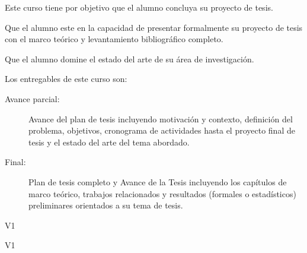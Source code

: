 \begin{syllabus}


\begin{justification}
Este curso tiene por objetivo que el alumno concluya su proyecto de tesis.
\end{justification}

\begin{goals}
\item Que el alumno este en la capacidad de presentar formalmente su proyecto de tesis con el marco teórico y levantamiento bibliográfico completo.
\item Que el alumno domine el estado del arte de su área de investigación.
\item Los entregables de este curso son:
	\begin{description}
	\item [Avance parcial:] Avance del plan de tesis incluyendo motivación y contexto, definición del problema, objetivos, cronograma de actividades hasta el proyecto final de tesis y el estado del arte del tema abordado.
	\item [Final:] Plan de tesis completo y Avance de la Tesis incluyendo los capítulos de marco teórico, trabajos relacionados y resultados (formales o estadísticos) preliminares orientados a su tema de tesis.
	\end{description}
\end{goals}

\begin{outcomes}{V1}
\item {}
\item {}
\item {}
\item {}
\item {}
\item {}
\item {}
\item {}
\end{outcomes}

\begin{competences}{V1}
\item {} 
\item {}
\item {}
\end{competences}


\end{syllabus}
